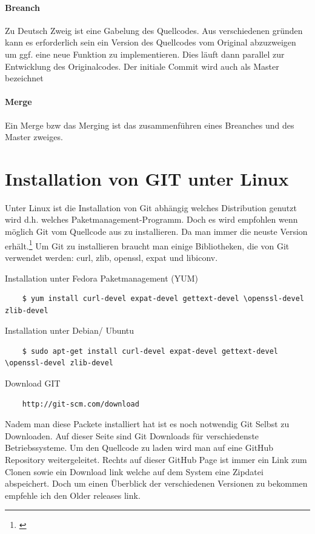 \documentclass[12pt,a4paper,bibliography=totocnumbered,listof=totocnumbered]{scrartcl}
\begin{document}
\paragraph{Breanch}
Zu Deutsch Zweig ist eine Gabelung des Quellcodes. Aus verschiedenen gründen kann es erforderlich sein ein Version des Quellcodes vom Original abzuzweigen um ggf. eine neue Funktion zu implementieren. Dies läuft dann parallel zur Entwicklung des Originalcodes. Der initiale Commit wird auch als Master bezeichnet 
\paragraph{Merge}
Ein Merge bzw das Merging ist das zusammenführen eines Breanches und des Master zweiges. 



\section{Installation von GIT unter Linux}
Unter Linux ist die Installation von Git abhängig welches Distribution genutzt wird d.h. welches Paketmanagement-Programm. Doch es wird empfohlen wenn möglich Git vom Quellcode aus zu installieren. Da man immer die neuste Version erhält.\footnote{\cite{chacon2009pro}} Um Git zu installieren braucht man einige Bibliotheken, die von Git verwendet werden: curl, zlib, openssl, expat und libiconv. 

Installation unter Fedora Paketmanagement (YUM)
\begin{lstlisting}
	$ yum install curl-devel expat-devel gettext-devel \openssl-devel zlib-devel
 \end{lstlisting}

Installation unter Debian/ Ubuntu
\begin{lstlisting}
	$ sudo apt-get install curl-devel expat-devel gettext-devel \openssl-devel zlib-devel
 \end{lstlisting}
 
Download GIT

\begin{lstlisting}
	http://git-scm.com/download
 \end{lstlisting}
 
 
Nadem man diese Packete installiert hat ist es noch notwendig Git Selbst zu Downloaden. Auf dieser Seite sind Git Downloads für verschiedenste Betriebssysteme. Um den Quellcode zu laden wird man auf eine GitHub Repository weitergeleitet. Rechts auf dieser GitHub Page ist immer ein Link zum Clonen sowie ein Download link welche auf dem System eine Zipdatei abspeichert. Doch um einen Überblick der verschiedenen Versionen zu bekommen 
empfehle ich den Older releases  link.
\end{document}
